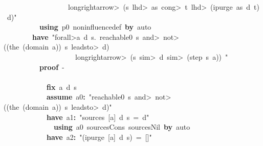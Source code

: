 \documentclass{article}
\newcommand{\syntaxKEYWORDA}[1]{\textcolor[rgb]{0.0,0.4,0.6}{\textbf{#1}}}
\newcommand{\syntaxKEYWORDC}[1]{\textcolor[rgb]{0.0,0.6,1.0}{\textbf{#1}}}
\newcommand{\syntaxLITERALA}[1]{\textcolor[rgb]{1.0,0.0,0.8}{#1}}
\newcommand{\syntaxOPERATOR}[1]{\textcolor[rgb]{0.0,0.0,0.0}{\textbf{#1}}}
\newcommand{\syntaxKEYWORDA}[1]{\textcolor[rgb]{0.0,0.4,0.6}{\textbf{#1}}}
\newcommand{\syntaxKEYWORDC}[1]{\textcolor[rgb]{0.0,0.6,1.0}{\textbf{#1}}}
\newcommand{\syntaxLITERALA}[1]{\textcolor[rgb]{1.0,0.0,0.8}{#1}}
\newcommand{\syntaxOPERATOR}[1]{\textcolor[rgb]{0.0,0.0,0.0}{\textbf{#1}}}
\newcommand{\syntaxKEYWORDA}[1]{\textcolor[rgb]{0.0,0.4,0.6}{\textbf{#1}}}
\newcommand{\syntaxKEYWORDC}[1]{\textcolor[rgb]{0.0,0.6,1.0}{\textbf{#1}}}
\newcommand{\syntaxLITERALA}[1]{\textcolor[rgb]{1.0,0.0,0.8}{#1}}
\newcommand{\syntaxOPERATOR}[1]{\textcolor[rgb]{0.0,0.0,0.0}{\textbf{#1}}}
\newcommand{\syntaxKEYWORDA}[1]{\textcolor[rgb]{0.0,0.4,0.6}{#1}}
\newcommand{\syntaxKEYWORDC}[1]{\textcolor[rgb]{0.0,0.6,1.0}{#1}}
\newcommand{\syntaxLITERALA}[1]{\textcolor[rgb]{1.0,0.0,0.8}{\textbf{#1}}}
\newcommand{\syntaxOPERATOR}[1]{\textcolor[rgb]{0.0,0.0,0.0}{#1}}
\newcommand{\syntaxKEYWORDA}[1]{\textcolor[rgb]{0.0,0.4,0.6}{\textbf{#1}}}
\newcommand{\syntaxKEYWORDC}[1]{\textcolor[rgb]{0.0,0.6,1.0}{\textbf{#1}}}
\newcommand{\syntaxLITERALA}[1]{\textcolor[rgb]{1.0,0.0,0.8}{#1}}
\newcommand{\syntaxOPERATOR}[1]{\textcolor[rgb]{0.0,0.0,0.0}{\textbf{#1}}}
\newcommand{\syntaxKEYWORDA}[1]{\textcolor[rgb]{0.0,0.4,0.6}{\textbf{#1}}}
\newcommand{\syntaxKEYWORDC}[1]{\textcolor[rgb]{0.0,0.6,1.0}{\textbf{#1}}}
\newcommand{\syntaxLITERALA}[1]{\textcolor[rgb]{1.0,0.0,0.8}{#1}}
\newcommand{\syntaxOPERATOR}[1]{\textcolor[rgb]{0.0,0.0,0.0}{\textbf{#1}}}
\begin{document}
\syntaxLITERALA{{\ }{\ }{\ }{\ }{\ }{\ }{\ }{\ }{\ }{\ }{\ }{\ }{\ }{\ }{\ }{\ }{\ }{\ }\<longrightarrow>{\ }(s{\ }\<lhd>{\ }as{\ }\<cong>{\ }t{\ }\<lhd>{\ }(ipurge{\ }as{\ }d{\ }t){\ }\usebox{\atbox}{\ }d)"}\hspace*{\fill}\\
{\ }{\ }{\ }{\ }{\ }{\ }{\ }{\ }{\ }{\ }\syntaxKEYWORDA{using}{\ }p0{\ }noninfluence\usebox{\underscorebox}def{\ }\syntaxKEYWORDA{by}{\ }auto\hspace*{\fill}\\
{\ }{\ }{\ }{\ }{\ }{\ }{\ }{\ }\syntaxKEYWORDA{have}{\ }\syntaxLITERALA{"\<forall>a{\ }d{\ }s.{\ }reachable0{\ }s{\ }\<and>{\ }\<not>((the{\ }(domain{\ }a)){\ }\usebox{\atbox}{\ }s{\ }\<leadsto>{\ }d){\ }}\hspace*{\fill}\\
\syntaxLITERALA{{\ }{\ }{\ }{\ }{\ }{\ }{\ }{\ }{\ }{\ }{\ }{\ }{\ }{\ }{\ }{\ }{\ }{\ }{\ }{\ }\<longrightarrow>{\ }(s{\ }\<sim>{\ }d{\ }\<sim>{\ }(step{\ }s{\ }a)){\ }"}\hspace*{\fill}\\
{\ }{\ }{\ }{\ }{\ }{\ }{\ }{\ }{\ }{\ }\syntaxKEYWORDA{proof}{\ }{-}\hspace*{\fill}\\
{\ }{\ }{\ }{\ }{\ }{\ }{\ }{\ }{\ }{\ }\syntaxKEYWORDA{\usebox{\opencurlybracket}}\hspace*{\fill}\\
{\ }{\ }{\ }{\ }{\ }{\ }{\ }{\ }{\ }{\ }{\ }{\ }\syntaxKEYWORDC{fix}{\ }a{\ }d{\ }s\hspace*{\fill}\\
{\ }{\ }{\ }{\ }{\ }{\ }{\ }{\ }{\ }{\ }{\ }{\ }\syntaxKEYWORDC{assume}{\ }a0\syntaxOPERATOR{:}{\ }\syntaxLITERALA{"reachable0{\ }s{\ }\<and>{\ }\<not>((the{\ }(domain{\ }a)){\ }\usebox{\atbox}{\ }s{\ }\<leadsto>{\ }d)"}\hspace*{\fill}\\
{\ }{\ }{\ }{\ }{\ }{\ }{\ }{\ }{\ }{\ }{\ }{\ }\syntaxKEYWORDA{have}{\ }a1\syntaxOPERATOR{:}{\ }\syntaxLITERALA{"sources{\ }{[}a{]}{\ }d{\ }s{\ }={\ }\usebox{\opencurlybracket}d\usebox{\closecurlybracket}"}\hspace*{\fill}\\
{\ }{\ }{\ }{\ }{\ }{\ }{\ }{\ }{\ }{\ }{\ }{\ }{\ }{\ }\syntaxKEYWORDA{using}{\ }a0{\ }sources\usebox{\underscorebox}Cons{\ }sources\usebox{\underscorebox}Nil{\ }\syntaxKEYWORDA{by}{\ }auto\hspace*{\fill}\\
{\ }{\ }{\ }{\ }{\ }{\ }{\ }{\ }{\ }{\ }{\ }{\ }\syntaxKEYWORDA{have}{\ }a2\syntaxOPERATOR{:}{\ }\syntaxLITERALA{"(ipurge{\ }{[}a{]}{\ }d{\ }s){\ }={\ }{[}{]}"}\hspace*{\fill}\\
\end{document}
